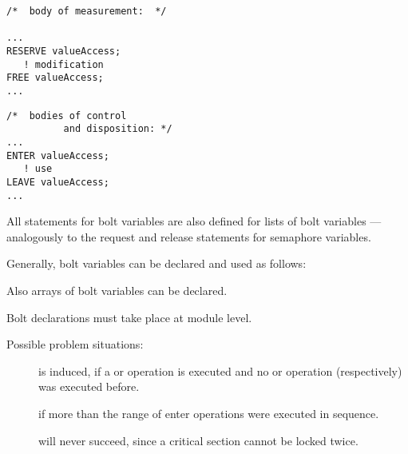 \begin{multicols}{2}
\begin{lstlisting}
/*  body of measurement:  */

...
RESERVE valueAccess;
   ! modification
FREE valueAccess;
...
\end{lstlisting}
\columnbreak
\begin{lstlisting}
/*  bodies of control
          and disposition: */
...
ENTER valueAccess;
   ! use
LEAVE valueAccess;
...
\end{lstlisting}
\end{multicols}

All statements for bolt variables are also defined for lists of bolt
variables --- analogously to the request and release statements for
semaphore variables.

Generally, bolt variables can be declared and used as follows:

\begin{grammarframe}




\end{grammarframe}

Also arrays of bolt variables can be declared.

Bolt declarations must take place at module level.

Possible problem situations:

\begin{description}
\item[] is induced, if a  or  operation
   is executed and no  or  operation (respectively) 
   was executed before.
\item [] if more than the range of  enter
   operations were executed in sequence.
\item[ ] will never succeed, since a
    critical section cannot be locked twice.
\end{description}

